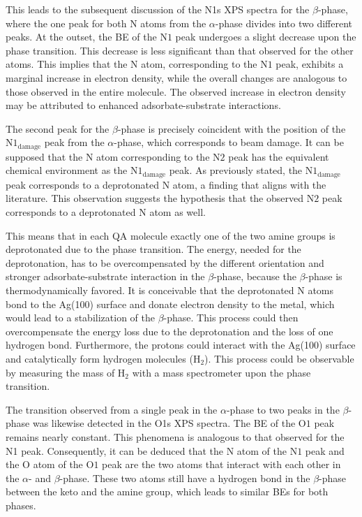 This leads to the subsequent discussion of the N1s \ac{XPS} spectra for the $\beta$-phase, where the one peak for both N atoms from the $\alpha$-phase divides into two different peaks. At the outset, the \ac{BE} of the $\mathrm{N1}$ peak undergoes a slight decrease upon the phase transition. This decrease is less significant than that observed for the other atoms. This implies that the N atom, corresponding to the $\mathrm{N1}$ peak, exhibits a marginal increase in electron density, while the overall changes are analogous to those observed in the entire molecule. The observed increase in electron density may be attributed to enhanced adsorbate-substrate interactions.

The second peak for the $\beta$-phase is precisely coincident with the position of the $\mathrm{N1_{damage}}$ peak from the $\alpha$-phase, which corresponds to beam damage. It can be supposed that the N atom corresponding to the $\mathrm{N2}$ peak has the equivalent chemical environment as the $\mathrm{N1_{damage}}$ peak. As previously stated, the $\mathrm{N1_{damage}}$ peak corresponds to a deprotonated N atom, a finding that aligns with the literature.\autocite{Kang1990, Ruano2021,M.Mahat2015} This observation suggests the hypothesis that the observed $\mathrm{N2}$ peak corresponds to a deprotonated N atom as well.

This means that in each \ac{QA} molecule exactly one of the two amine groups is deprotonated due to the phase transition. The energy, needed for the deprotonation, has to be overcompensated by the different orientation and stronger adsorbate-substrate interaction in the $\beta$-phase, because the $\beta$-phase is thermodynamically favored.\autocite{Humberg2024} It is conceivable that the deprotonated N atoms bond to the Ag(100) surface and donate electron density to the metal, which would lead to a stabilization of the $\beta$-phase. This process could then overcompensate the energy loss due to the deprotonation and the loss of one hydrogen bond. Furthermore, the protons could interact with the Ag(100) surface and catalytically form hydrogen molecules (H$_2$). This process could be observable by measuring the mass of H$_2$ with a mass spectrometer upon the phase transition.
 
The transition observed from a single peak in the $\alpha$-phase to two peaks in the $\beta$-phase was likewise detected in the O1s \ac{XPS} spectra. The \ac{BE} of the $\mathrm{O1}$ peak remains nearly constant. This phenomena is analogous to that observed for the N1 peak. Consequently, it can be deduced that the N atom of the $\mathrm{N1}$ peak and the O atom of the $\mathrm{O1}$ peak are the two atoms that interact with each other in the $\alpha$- and $\beta$-phase. These two atoms still have a hydrogen bond in the $\beta$-phase between the keto and the amine group, which leads to similar \acp{BE} for both phases.

